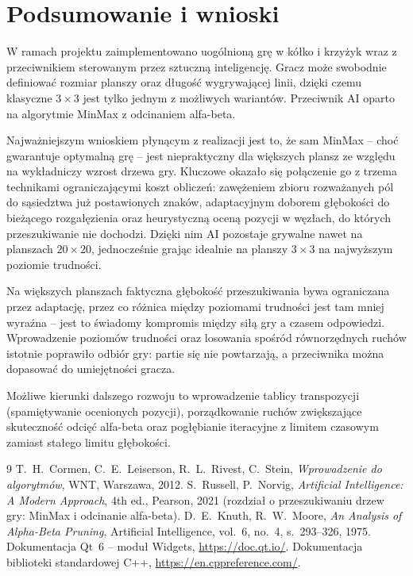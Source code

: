 \section{Podsumowanie i wnioski}

W ramach projektu zaimplementowano uogólnioną grę w kółko i krzyżyk wraz z przeciwnikiem sterowanym
przez sztuczną inteligencję. Gracz może swobodnie definiować rozmiar planszy oraz długość
wygrywającej linii, dzięki czemu klasyczne $3\times3$ jest tylko jednym z możliwych wariantów.
Przeciwnik AI oparto na algorytmie MinMax z odcinaniem alfa-beta.

Najważniejszym wnioskiem płynącym z realizacji jest to, że sam MinMax -- choć gwarantuje optymalną
grę -- jest niepraktyczny dla większych plansz ze względu na wykładniczy wzrost drzewa gry.
Kluczowe okazało się połączenie go z trzema technikami ograniczającymi koszt obliczeń: zawężeniem
zbioru rozważanych pól do sąsiedztwa już postawionych znaków, adaptacyjnym doborem głębokości do
bieżącego rozgałęzienia oraz heurystyczną oceną pozycji w węzłach, do których przeszukiwanie nie
dochodzi. Dzięki nim AI pozostaje grywalne nawet na planszach $20\times20$, jednocześnie grając
idealnie na planszy $3\times3$ na najwyższym poziomie trudności.

Na większych planszach faktyczna głębokość przeszukiwania bywa ograniczana przez adaptację, przez co
różnica między poziomami trudności jest tam mniej wyraźna -- jest to świadomy kompromis między siłą
gry a czasem odpowiedzi. Wprowadzenie poziomów trudności oraz losowania spośród równorzędnych ruchów
istotnie poprawiło odbiór gry: partie się nie powtarzają, a przeciwnika można dopasować do
umiejętności gracza.

Możliwe kierunki dalszego rozwoju to wprowadzenie tablicy transpozycji (spamiętywanie ocenionych
pozycji), porządkowanie ruchów zwiększające skuteczność odcięć alfa-beta oraz pogłębianie iteracyjne
z limitem czasowym zamiast stałego limitu głębokości.


\begin{thebibliography}{9}
 T.~H.~Cormen, C.~E.~Leiserson, R.~L.~Rivest, C.~Stein,
\emph{Wprowadzenie do algorytmów}, WNT, Warszawa, 2012.
 S.~Russell, P.~Norvig,
\emph{Artificial Intelligence: A Modern Approach}, 4th ed., Pearson, 2021
(rozdział o przeszukiwaniu drzew gry: MinMax i odcinanie alfa-beta).
 D.~E.~Knuth, R.~W.~Moore,
\emph{An Analysis of Alpha-Beta Pruning}, Artificial Intelligence, vol.~6, no.~4, s.~293--326, 1975.
 Dokumentacja Qt~6 -- moduł Widgets, \url{https://doc.qt.io/}.
 Dokumentacja biblioteki standardowej C++, \url{https://en.cppreference.com/}.
\end{thebibliography}


